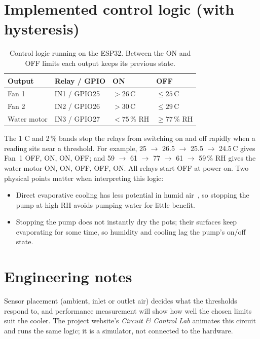 \documentclass[11pt,a4paper]{report}
\newcommand{\degC}{\,\textdegree C}
\begin{document}
\section{Implemented control logic (with hysteresis)}
\begin{table}[H]
\centering
\caption{Control logic running on the ESP32. Between the ON and OFF limits each output keeps its previous state.}
\label{tab:fans}
\begin{tabular}{@{}llll@{}}
\toprule
\textbf{Output} & \textbf{Relay / GPIO} & \textbf{ON} & \textbf{OFF} \\
\midrule
Fan 1 & IN1 / GPIO25 & $> 26$\degC & $\le 25$\degC \\
Fan 2 & IN2 / GPIO26 & $> 30$\degC & $\le 29$\degC \\
Water motor & IN3 / GPIO27 & $< 75$\,\% RH & $\ge 77$\,\% RH \\
\bottomrule
\end{tabular}
\end{table}
\label{tab:pump}

\noindent The 1\,\degC{} and 2\,\% bands stop the relays from switching on and off rapidly when a reading sits near a threshold. For example, 25 $\rightarrow$ 26.5 $\rightarrow$ 25.5 $\rightarrow$ 24.5\degC{} gives Fan~1 OFF, ON, ON, OFF; and 59 $\rightarrow$ 61 $\rightarrow$ 77 $\rightarrow$ 61 $\rightarrow$ 59\,\% RH gives the water motor ON, ON, OFF, OFF, ON. All relays start OFF at power-on. Two physical points matter when interpreting this logic:
\begin{itemize}
\item Direct evaporative cooling has less potential in humid air~\cite{watson}, so stopping the pump at high RH avoids pumping water for little benefit.
\item Stopping the pump does not instantly dry the pots; their surfaces keep evaporating for some time, so humidity and cooling lag the pump's on/off state.
\end{itemize}

\section{Engineering notes}
Sensor placement (ambient, inlet or outlet air) decides what the thresholds respond to, and performance measurement will show how well the chosen limits suit the cooler. The project website's \emph{Circuit \& Control Lab} animates this circuit and runs the same logic; it is a simulator, not connected to the hardware.
\end{document}
